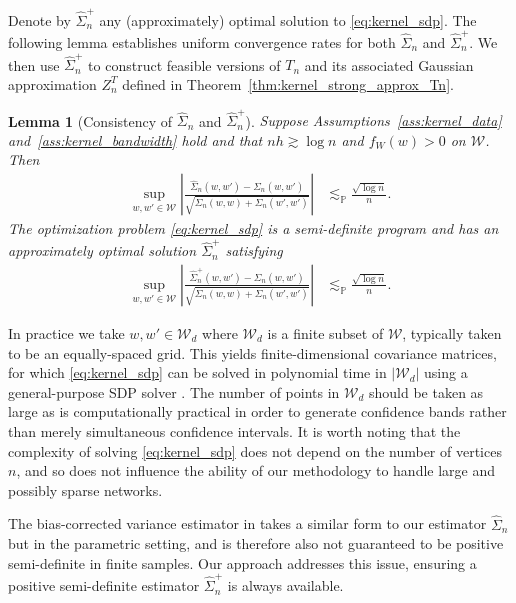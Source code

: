 \documentclass[11pt,lof]{puthesis}
\renewcommand{\P}{\ensuremath{\mathbb{P}}}
\newcommand{\cW}{\ensuremath{\mathcal{W}}}
\theoremstyle{break}
\newtheorem{lemma}{Lemma}[section]
\theoremstyle{proof}
\begin{document}
Denote by $\hat\Sigma_n^+$ any (approximately) optimal solution to
\eqref{eq:kernel_sdp}. The following lemma establishes uniform convergence rates
for both $\hat \Sigma_n$ and $\hat \Sigma_n^+$.
We then use $\hat \Sigma_n^+$ to construct feasible versions of $T_n$ and its
associated Gaussian approximation $Z_n^{T}$ defined in
Theorem~\ref{thm:kernel_strong_approx_Tn}.
%
\begin{lemma}[Consistency of $\hat \Sigma_n$ and $\hat \Sigma_n^+$]
\label{lem:kernel_sdp}
Suppose Assumptions~\ref{ass:kernel_data} and~\ref{ass:kernel_bandwidth} hold
and that $n h \gtrsim \log n$ and $f_W(w) > 0$ on $\cW$. Then
%
\begin{align*}
\sup_{w,w' \in \cW}
\left| \frac{\hat \Sigma_n(w,w') - \Sigma_n(w,w')}
{\sqrt{\Sigma_n(w,w) + \Sigma_n(w',w')}} \right|
&\lesssim_\P \frac{\sqrt{\log n}}{n}.
\end{align*}
%
The optimization problem \eqref{eq:kernel_sdp} is a semi-definite
program
\citep[SDP,][]{laurent2005semidefinite} and has an approximately optimal
solution $\hat\Sigma_n^+$ satisfying
%
\begin{align*}
\sup_{w,w' \in \cW} \left|
\frac{\hat \Sigma_n^+(w,w') - \Sigma_n(w,w')}
{\sqrt{\Sigma_n(w,w) + \Sigma_n(w',w')}} \right|
&\lesssim_\P \frac{\sqrt{\log n}}{n}.
\end{align*}
%
\end{lemma}

In practice we take $w, w' \in \cW_d$ where $\cW_d$ is a finite subset of
$\cW$, typically taken to be an equally-spaced grid. This yields
finite-dimensional covariance matrices, for which \eqref{eq:kernel_sdp} can be
solved
in polynomial time in $|\cW_d|$ using a general-purpose SDP solver
\citep[e.g.\ by interior point methods,][]{laurent2005semidefinite}.
The number of points in $\cW_d$ should be taken as large as is computationally
practical in order to generate confidence bands rather than merely simultaneous
confidence intervals. It is worth noting that the complexity of solving
\eqref{eq:kernel_sdp} does not depend on the number of vertices $n$, and so
does not
influence the ability of our methodology to handle large and possibly sparse
networks.

The bias-corrected variance estimator in
\citet[Section~3.2]{matsushita2021jackknife} takes a similar form to our
estimator
$\hat\Sigma_n$ but in the parametric setting, and is therefore also not
guaranteed to be positive semi-definite in finite samples. Our approach
addresses this issue, ensuring a positive semi-definite estimator
$\hat\Sigma_n^+$ is always available.
\end{document}
